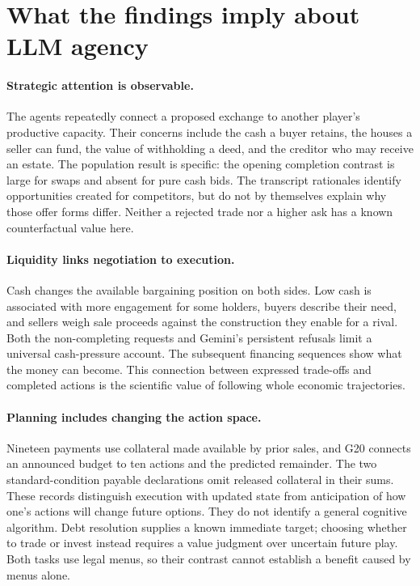 \section{What the findings imply about LLM agency}
\label{sec:discussion}

\paragraph{Strategic attention is observable.}
The agents repeatedly connect a proposed exchange to another player's productive capacity. Their concerns include the cash a buyer retains, the houses a seller can fund, the value of withholding a deed, and the creditor who may receive an estate. The population result is specific: the opening completion contrast is large for swaps and absent for pure cash bids. The transcript rationales identify opportunities created for competitors, but do not by themselves explain why those offer forms differ. Neither a rejected trade nor a higher ask has a known counterfactual value here.

\paragraph{Liquidity links negotiation to execution.}
Cash changes the available bargaining position on both sides. Low cash is associated with more engagement for some holders, buyers describe their need, and sellers weigh sale proceeds against the construction they enable for a rival. Both the non-completing requests and Gemini's persistent refusals limit a universal cash-pressure account. The subsequent financing sequences show what the money can become. This connection between expressed trade-offs and completed actions is the scientific value of following whole economic trajectories.

\paragraph{Planning includes changing the action space.}
Nineteen payments use collateral made available by prior sales, and G20 connects an announced budget to ten actions and the predicted remainder. The two standard-condition payable declarations omit released collateral in their sums. These records distinguish execution with updated state from anticipation of how one's actions will change future options. They do not identify a general cognitive algorithm. Debt resolution supplies a known immediate target; choosing whether to trade or invest instead requires a value judgment over uncertain future play. Both tasks use legal menus, so their contrast cannot establish a benefit caused by menus alone.

